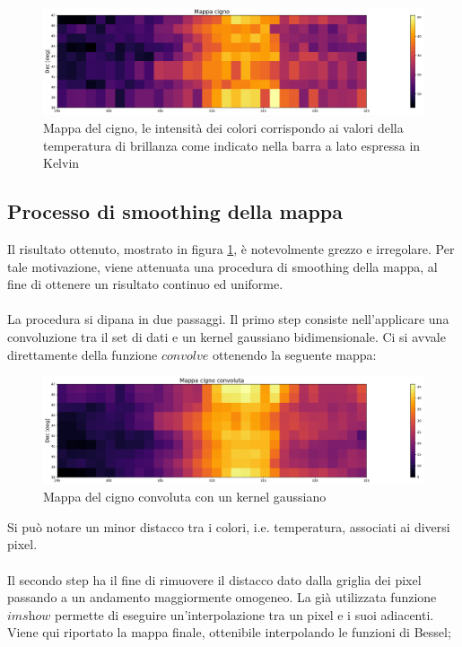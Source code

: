 \begin{figure}[H]
	\centering
	\includegraphics[scale=0.4]{Mappa_grezza.pdf}
	\caption{Mappa del cigno, le intensità dei colori corrispondo ai valori della temperatura di brillanza come indicato nella barra a lato espressa in Kelvin}
    	\label{fig:Mappa_grezza}
\end{figure}

\subsection{Processo di smoothing della mappa}

Il risultato ottenuto, mostrato in figura \ref{fig:Mappa_grezza}, è notevolmente grezzo e irregolare. Per tale motivazione, viene attenuata una procedura di smoothing della mappa, al fine di ottenere un risultato continuo ed uniforme.
\\\\
La procedura si dipana in due passaggi. Il primo step consiste nell'applicare una convoluzione tra il set di dati e un kernel gaussiano bidimensionale. Ci si avvale direttamente della funzione $\textit{convolve}$ ottenendo la seguente mappa:

\begin{figure}[H]
	\centering
	\includegraphics[scale=0.4]{Mappa_convolve.pdf}
	\caption{Mappa del cigno convoluta con un kernel gaussiano}
    	\label{fig:Mappa_convolve}
\end{figure}

Si può notare un minor distacco tra i colori, i.e. temperatura, associati ai diversi pixel.
\\\\
Il secondo step ha il fine di rimuovere il distacco dato dalla griglia dei pixel passando a un andamento maggiormente omogeneo. La già utilizzata funzione $\textit{imshow}$ permette di eseguire un'interpolazione tra un pixel e i suoi adiacenti. Viene qui riportato la mappa finale, ottenibile interpolando le funzioni di Bessel; 

